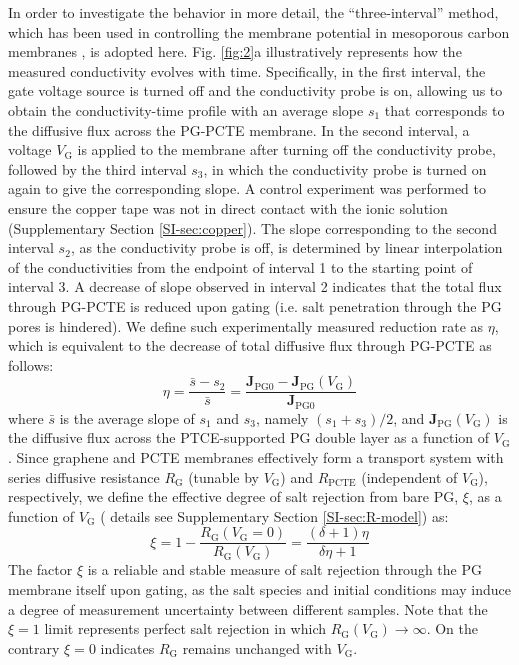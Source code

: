 \documentclass[journal=nalefd,email=true, hyperref=true, keywords=false]{achemso}
\newcommand{\Fig}{Fig.}
\begin{document}
In order to investigate the behavior in more detail, the ``three-interval'' method, which has been used
in controlling the membrane potential in mesoporous carbon membranes
\cite{Surwade_2014}, is adopted here. \Fig{} \ref{fig:2}a
illustratively represents how the measured conductivity evolves with
time. Specifically, in the first interval, the gate voltage source is
turned off and the conductivity probe is on, allowing us to obtain the
conductivity-time profile with an average slope $s_{1}$ that
corresponds to the diffusive flux across the PG-PCTE membrane. In the
second interval, a voltage $V_{\mathrm{G}}$ is applied to the membrane
after turning off the conductivity probe, followed by the third
interval $s_{3}$, in which the conductivity probe is turned on again
to give the corresponding slope. A control experiment was performed to
ensure the copper tape was not in direct contact with the ionic
solution (Supplementary Section \ref{SI-sec:copper}). The slope
corresponding to the second interval $s_{2}$, as the conductivity
probe is off, is determined by linear interpolation of the
conductivities from the endpoint of interval 1 to the starting point
of interval 3. A decrease of slope observed in interval 2 indicates
that the total flux through PG-PCTE is reduced upon gating (i.e. salt
penetration through the PG pores is hindered). We define such
experimentally measured reduction rate as $\eta$, which is equivalent
to the decrease of total diffusive flux through PG-PCTE as follows:
\begin{equation}
  \label{eq:rejection}
  \eta = \frac{\bar{s} - s_{2}}{\bar{s}} = \frac{\boldsymbol{J}_{\mathrm{PG0}}
    - \boldsymbol{J}_{\mathrm{PG}}(V_{\mathrm{G}})}{\boldsymbol{J}_{\mathrm{PG0}}}
\end{equation}
where $\bar{s}$ is the average slope of $s_{1}$ and $s_{3}$, namely
$(s_{1} + s_{3})/2$, and
$\boldsymbol{J}_{\mathrm{PG}}(V_{\mathrm{G}})$ is the diffusive flux
across the PTCE-supported PG double layer as a function of
$V_{\mathrm{G}}$. Since graphene and PCTE membranes effectively form a
transport system with series diffusive resistance $R_{\mathrm{G}}$
(tunable by $V_{\mathrm{G}}$) and $R_{\mathrm{PCTE}}$ (independent of
$V_{\mathrm{G}}$), respectively, we define the effective degree of
salt rejection from bare PG, $\xi$, as a function of $V_{\mathrm{G}}$ (
details see Supplementary Section \ref{SI-sec:R-model}) as:
\begin{equation}
\label{eq:xi-def}
\xi = 1 - \frac{R_{\mathrm{G}}(V_{\mathrm{G}}=0)}{R_{\mathrm{G}}(V_{\mathrm{G}})} = \frac{(\delta+1) \eta}{\delta \eta + 1}
\end{equation}
The factor $\xi$ is a reliable and stable measure of salt rejection
through the PG membrane itself upon gating, as the salt species and
initial conditions may induce a degree of measurement uncertainty
between different samples. Note that the $\xi=1$ limit represents
perfect salt rejection in which
$R_{\mathrm{G}}(V_{\mathrm{G}}) \to \infty$. On the contrary $\xi=0$
indicates $R_{\mathrm{G}}$ remains unchanged with $V_{\mathrm{G}}$.
\end{document}
